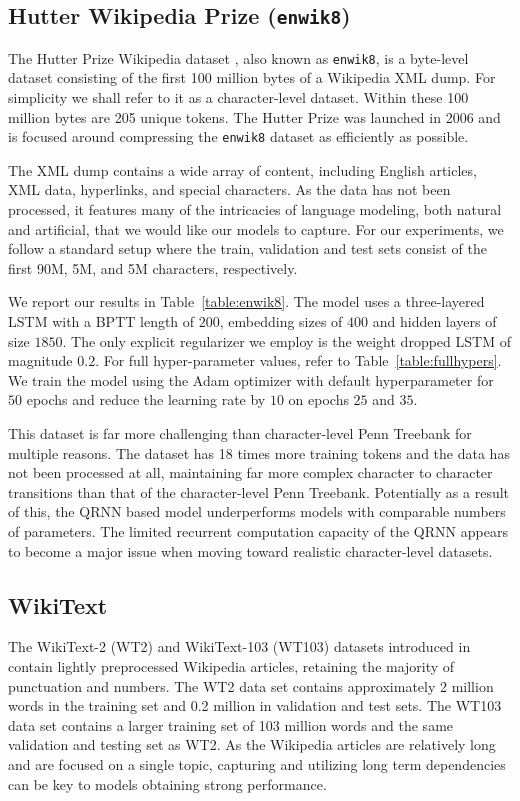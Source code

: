 \documentclass{article}
\newcommand{\enwik}{\texttt{enwik8}\xspace}
\begin{document}
\subsection{Hutter Wikipedia Prize (\enwik)}

The Hutter Prize Wikipedia dataset \cite{hutter}, also known as \enwik, is a byte-level dataset consisting of the first 100 million bytes of a Wikipedia XML dump.
For simplicity we shall refer to it as a character-level dataset.
Within these 100 million bytes are 205 unique tokens.
The Hutter Prize was launched in 2006 and is focused around compressing the \enwik dataset as efficiently as possible.

The XML dump contains a wide array of content, including English articles, XML data, hyperlinks, and special characters.
As the data has not been processed, it features many of the intricacies of language modeling, both natural and artificial, that we would like our models to capture.
For our experiments, we follow a standard setup where the train, validation and test sets consist of the first 90M, 5M, and 5M characters, respectively.

We report our results in Table~\ref{table:enwik8}.
The model uses a three-layered LSTM with a BPTT length of $200$, embedding sizes of $400$ and hidden layers of size $1850$.
The only explicit regularizer we employ is the weight dropped LSTM \cite{merity2018regularizing} of magnitude $0.2$.
For full hyper-parameter values, refer to Table~\ref{table:fullhypers}.
We train the model using the Adam \cite{kingma2014adam} optimizer with default hyperparameter for $50$ epochs and reduce the learning rate by $10$ on epochs $25$ and $35$.

This dataset is far more challenging than character-level Penn Treebank for multiple reasons.
The dataset has 18 times more training tokens and the data has not been processed at all, maintaining far more complex character to character transitions than that of the character-level Penn Treebank.
Potentially as a result of this, the QRNN based model underperforms models with comparable numbers of parameters.
The limited recurrent computation capacity of the QRNN appears to become a major issue when moving toward realistic character-level datasets.

\subsection{WikiText}
The WikiText-2 (WT2) and WikiText-103 (WT103) datasets introduced in \citet{Merity2016} contain lightly preprocessed Wikipedia articles, retaining the majority of punctuation and numbers.
The WT2 data set contains approximately 2 million words in the training set and 0.2 million in validation and test sets.
The WT103 data set contains a larger training set of 103 million words and the same validation and testing set as WT2.
As the Wikipedia articles are relatively long and are focused on a single topic, capturing and utilizing long term dependencies can be key to models obtaining strong performance. 
\end{document}
